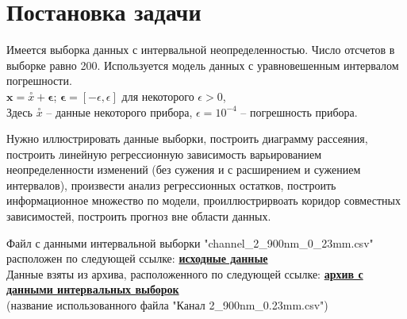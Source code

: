 \section{Постановка задачи}

Имеется выборка данных с интервальной неопределенностью. Число отсчетов в выборке равно 200. Используется модель данных с  уравновешенным интервалом погрешности. \\

$\bm{x} = \stackrel{\circ}{x} + \bm{\epsilon}$; \quad $\bm{\epsilon} = [-\epsilon, \epsilon]$  для некоторого $\epsilon >0 $, \\

Здесь $\stackrel{\circ}{x}$ -- данные некоторого прибора, $\epsilon = 10 ^ {-4}$ -- погрешность прибора.

Нужно иллюстрировать данные выборки, построить диаграмму рассеяния, построить линейную регрессионную зависимость варьированием неопределенности изменений (без сужения и с расширением и сужением интервалов),  произвести анализ регрессионных остатков, построить информационное множество по модели, проиллюстрирвоать коридор совместных зависимостей, построить прогноз вне области данных. 

Файл с данными интервальной выборки "channel\_2\_900nm\_0\_23mm.csv" \quad расположен по следующей ссылке: \href{https://github.com/anivse/MathematicalStatistics/tree/main/4/source}{\textbf{исходные данные}} \\
Данные взяты из архива, расположенного по следующей ссылке: \href{https://github.com/AlexanderBazhenov/Solar-Data/blob/main/%D0%A1%D1%82%D0%B0%D1%82%D0%B8%D1%81%D1%82%D0%B8%D0%BA%D0%B0%20%D0%B8%D0%B7%D0%BC%D0%B5%D1%80%D0%B5%D0%BD%D0%B8%D0%B9.rar}{\textbf{архив с данными интервальных выборок}} \\(название использованного файла "Канал 2\_900nm\_0.23mm.csv")

